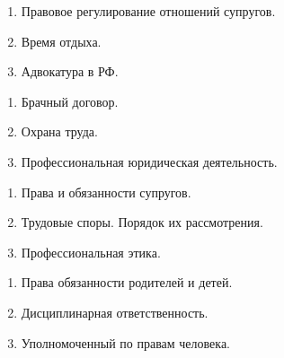 \newpage


\shapkFull
\setcounter{zad}{0}

\begin{enumerate}
	\item Правовое регулирование отношений супругов.

	\item Время отдыха.

	\item Адвокатура в РФ.

\end{enumerate}

\newpage


\shapkFull
\setcounter{zad}{0}

\begin{enumerate}
	\item Брачный договор.

	\item Охрана труда.

	\item Профессиональная юридическая деятельность.

\end{enumerate}

\newpage


\shapkFull
\setcounter{zad}{0}

\begin{enumerate}
	\item Права и обязанности супругов.

	\item Трудовые споры. Порядок их рассмотрения.

	\item Профессиональная этика.

\end{enumerate}

\newpage


\shapkFull
\setcounter{zad}{0}

\begin{enumerate}
	\item Права обязанности родителей и детей.

	\item Дисциплинарная ответственность.

	\item Уполномоченный по правам человека.

\end{enumerate}

